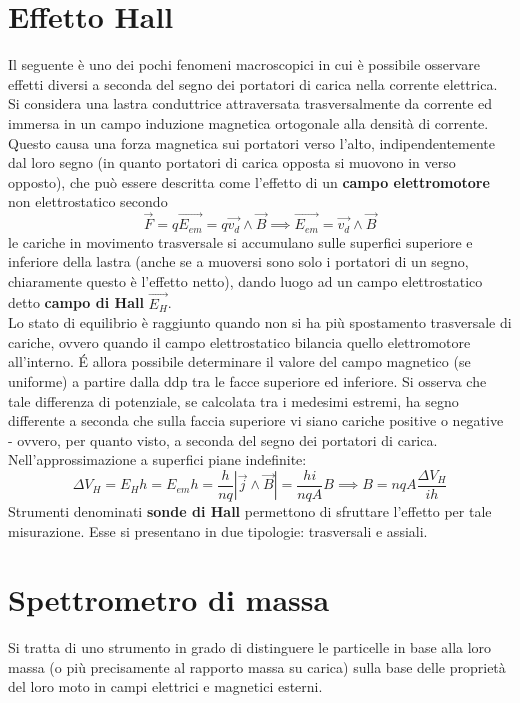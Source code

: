 \section{Effetto Hall}
Il seguente è uno dei pochi fenomeni macroscopici in cui è possibile osservare effetti diversi a seconda del segno dei portatori di carica nella corrente elettrica.
\\Si considera una lastra conduttrice attraversata trasversalmente da corrente ed immersa in un campo induzione magnetica ortogonale alla densità di corrente.
\\Questo causa una forza magnetica sui portatori verso l'alto, indipendentemente dal loro segno (in quanto portatori di carica opposta si muovono in verso opposto), che può essere descritta come l'effetto di un \textbf{campo elettromotore} non elettrostatico secondo
\[\vec{F} = q \vec{E_{em}} = q \vec{v_d} \wedge \vec{B} \implies \vec{E_{em}} = \vec{v_d} \wedge \vec{B} \]
le cariche in movimento trasversale si accumulano sulle superfici superiore e inferiore della lastra (anche se a muoversi sono solo i portatori di un segno, chiaramente questo è l'effetto netto), dando luogo ad un campo elettrostatico detto \textbf{campo di Hall} $\vec{E_H}$.
\\Lo stato di equilibrio è raggiunto quando non si ha più spostamento trasversale di cariche, ovvero quando il campo elettrostatico bilancia quello elettromotore all'interno. \'E allora possibile determinare il valore del campo magnetico (se uniforme) a partire dalla ddp tra le facce superiore ed inferiore. Si osserva che tale differenza di potenziale, se calcolata tra i medesimi estremi, ha segno differente a seconda che sulla faccia superiore vi siano cariche positive o negative - ovvero, per quanto visto, a seconda del segno dei portatori di carica. Nell'approssimazione a superfici piane indefinite:
\[\Delta V_H = E_H h = E_{em} h = \frac{h}{nq} |\vec{j} \wedge \vec{B}| = \frac{h i}{nq A} B \implies B = nqA \frac{\Delta V_H}{i h}\]
Strumenti denominati \textbf{sonde di Hall} permettono di sfruttare l'effetto per tale misurazione. Esse si presentano in due tipologie: trasversali e assiali.

\section{Spettrometro di massa}
Si tratta di uno strumento in grado di distinguere le particelle in base alla loro massa (o più precisamente al rapporto massa su carica) sulla base delle proprietà del loro moto in campi elettrici e magnetici esterni.

